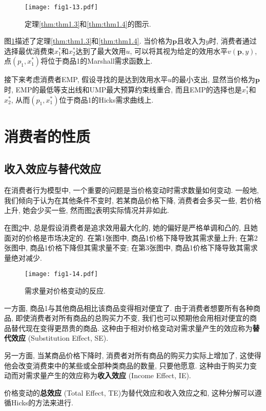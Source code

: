 \documentclass[cn, 12pt, math=mtpro2, bibstyle=apa, blue, twocol]{elegantbook}
\newcommand{\p}{\mathbf{p}}
\begin{document}
\begin{figure}[htbp!]
  \centering
  \texttt{[image: fig1-13.pdf]}
  \caption{定理\ref{thm:thm1.3}和\ref{thm:thm1.4}的图示.}\label{fig1.13}
\end{figure}

图\ref{fig1.13}描述了定理\ref{thm:thm1.3}和\ref{thm:thm1.4}. 当价格为$\p$且收入为$y$时, 消费者通过选择最优消费束$x_1^\ast$和$x_2^\ast$达到了最大效用$u$, 可以将其视为给定的效用水平$v(\p,y)$, 点$(p_1,x^\ast_1)$将位于商品1的Marshall需求函数上.

接下来考虑消费者EMP, 假设寻找的是达到效用水平$u$的最小支出, 显然当价格为$\p$时, EMP的最低等支出线和UMP最大预算约束线重合, 而且EMP的选择也是$x_1^\ast$和$x_2^\ast$, 从而$(p_1,x_1^\ast)$位于商品1的Hicks需求曲线上.


\section{消费者的性质}
\subsection{收入效应与替代效应}
在消费者行为模型中, 一个重要的问题是当价格变动时需求数量如何变动. 一般地, 我们倾向于认为在其他条件不变时, 若某商品价格下降, 消费者会多买一些, 若价格上升, 她会少买一些, 然而图\ref{fig1.14}表明实际情况并非如此.

在图\ref{fig1.14}中, 总是假设消费者是追求效用最大化的, 她的偏好是严格单调和凸的, 且她面对的价格是市场决定的. 在第1张图中, 商品1价格下降导致其需求量上升; 在第2张图中, 商品1价格下降但其需求量不变; 在第3张图中, 商品1价格下降导致其需求量绝对减少.
\begin{figure}[htbp!]
  \centering
  \texttt{[image: fig1-14.pdf]}
  \caption{需求量对价格变动的反应.}\label{fig1.14}
\end{figure}

一方面, 商品1与其他商品相比该商品变得相对便宜了. 由于消费者想要所有各种商品, 即使消费者对所有商品的总购买力不变, 我们也可以预期他会用相对便宜的商品替代现在变得更昂贵的商品. 这种由于相对价格变动对需求量产生的效应称为\textbf{替代效应} (Substitution Effect, SE).

另一方面, 当某商品价格下降时, 消费者对所有商品的购买力实际上增加了, 这使得他会改变消费束中的某些或全部种类商品的数量, 只要他愿意. 这种由于购买力变动而对需求量产生的效应称为\textbf{收入效应} (Income Effect, IE).

价格变动的\textbf{总效应} (Total Effect, TE)为替代效应和收入效应之和, 这种分解可以遵循Hicks的方法来进行.
\end{document}
